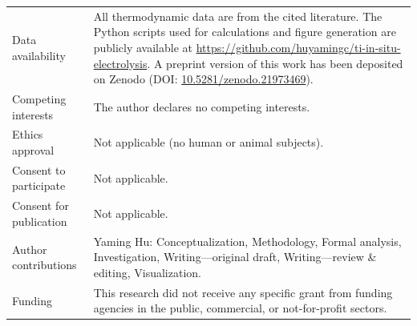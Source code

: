 \documentclass[pdflatex,sn-basic,Numbered]{sn-jnl}
\begin{document}
{\renewcommand{\arraystretch}{1.18}%
\begin{tabularx}{\linewidth}{@{}l@{\hspace{1.2em}}>{\raggedright\arraybackslash}X@{}}
Data availability & All thermodynamic data are from the cited literature. The Python scripts used for calculations and figure generation are publicly available at \url{https://github.com/huyamingc/ti-in-situ-electrolysis}. A preprint version of this work has been deposited on Zenodo (DOI: \href{https://doi.org/10.5281/zenodo.21973469}{10.5281/zenodo.21973469}). \\[3pt]
Competing interests & The author declares no competing interests. \\[3pt]
Ethics approval & Not applicable (no human or animal subjects). \\[3pt]
Consent to participate & Not applicable. \\[3pt]
Consent for publication & Not applicable. \\[3pt]
Author contributions & Yaming Hu: Conceptualization, Methodology, Formal analysis, Investigation, Writing---original draft, Writing---review \& editing, Visualization. \\[3pt]
Funding & This research did not receive any specific grant from funding agencies in the public, commercial, or not-for-profit sectors.
\end{tabularx}}


\end{document}
